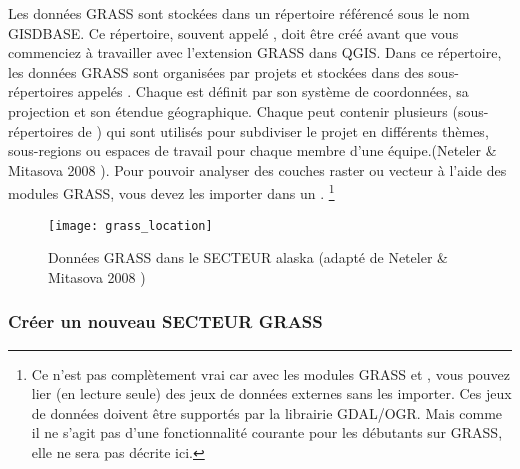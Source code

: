 Les donn\'ees GRASS sont stock\'ees dans un r\'epertoire r\'ef\'erenc\'e sous le nom GISDBASE. Ce r\'epertoire, souvent appel\'e , doit \^etre cr\'e\'e avant que vous commenciez \`a travailler avec l'extension GRASS dans QGIS. Dans ce r\'epertoire, les donn\'ees GRASS sont organis\'ees par projets et stock\'ees dans des sous-r\'epertoires appel\'es . Chaque  est d\'efinit par son syst\`eme de coordonn\'ees, sa projection et son \'etendue g\'eographique. Chaque  peut contenir plusieurs  (sous-r\'epertoires de ) qui sont utilis\'es pour subdiviser le projet en diff\'erents th\`emes, sous-regions ou espaces de travail pour chaque membre d'une \'equipe.(Neteler \& Mitasova 2008 \cite{neteler_mitasova08}). Pour pouvoir analyser des couches raster ou vecteur \`a l'aide des modules GRASS, vous devez les importer dans un . \footnote {Ce n'est pas compl\`etement vrai car avec les modules GRASS  et , vous pouvez lier (en lecture seule) des jeux de donn\'ees externes sans les importer. Ces jeux de donn\'ees doivent \^etre support\'es par la librairie GDAL/OGR. Mais comme il ne s'agit pas d'une fonctionnalit\'e courante pour les d\'ebutants sur GRASS, elle ne sera pas d\'ecrite ici.}

\begin{figure}[ht]
\begin{center}
\caption{Donn\'ees GRASS dans le SECTEUR alaska (adapt\'e de Neteler \& Mitasova 2008 \cite{neteler_mitasova08})}\label{fig:grass_location}\smallskip
\texttt{[image: grass\_location]}
\end{center}  
\end{figure}

\subsubsection{Cr\'eer un nouveau SECTEUR GRASS}\label{sec:create_loc}


